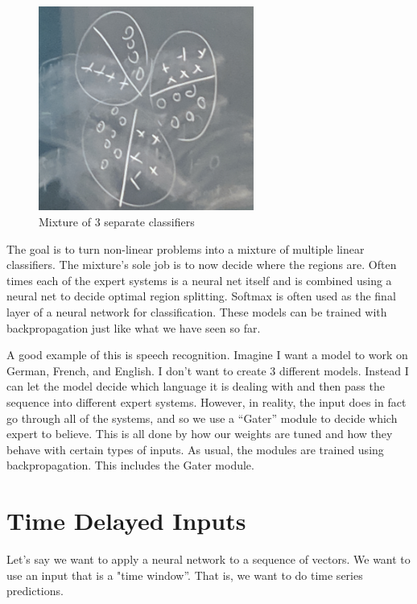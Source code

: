 \begin{figure}
    \centering
    \includegraphics[width=200pt]{figs/mixture.png}
    \caption{Mixture of 3 separate classifiers}
    \label{fig:mixture}
\end{figure}

The goal is to turn non-linear problems into a mixture of multiple linear classifiers. 
The mixture's sole job is to now decide where the regions are. 
Often times each of the expert systems is a neural net itself and is combined using a neural net to decide optimal region splitting. 
Softmax is often used as the final layer of a neural network for classification. 
These models can be trained with backpropagation just like what we have seen so far. 

A good example of this is speech recognition. 
Imagine I want a model to work on German, French, and English. 
I don't want to create 3 different models. 
Instead I can let the model decide which language it is dealing with and then pass the sequence into different expert systems. 
However, in reality, the input does in fact go through all of the systems, and so we use a ``Gater'' module to decide which expert to believe. 
This is all done by how our weights are tuned and how they behave with certain types of inputs. 
As usual, the modules are trained using backpropagation. 
This includes the Gater module.

\section{Time Delayed Inputs}

Let's say we want to apply a neural network to a sequence of vectors. 
We want to use an input that is a "time window''. 
That is, we want to do time series predictions.

